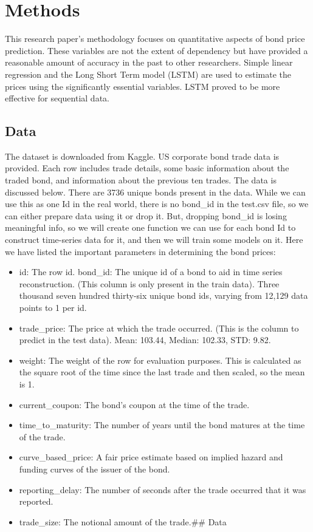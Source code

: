 \documentclass[
  man]{apa6}
\providecommand{\tightlist}{%
  \setlength{\itemsep}{0pt}\setlength{\parskip}{0pt}}
\begin{document}
\par

\hypertarget{methods}{%
\section{Methods}\label{methods}}

This research paper's methodology focuses on quantitative aspects of bond price prediction. These variables are not the extent of dependency but have provided a reasonable amount of accuracy in the past to other researchers. Simple linear regression and the Long Short Term model (LSTM) are used to estimate the prices using the significantly essential variables. LSTM proved to be more effective for sequential data.

\hypertarget{data}{%
\subsection{Data}\label{data}}

The dataset is downloaded from Kaggle. US corporate bond trade data is provided. Each row includes trade details, some basic information about the traded bond, and information about the previous ten trades. The data is discussed below. There are 3736 unique bonds present in the data. While we can use this as one Id in the real world, there is no bond\_id in the test.csv file, so we can either prepare data using it or drop it. But, dropping bond\_id is losing meaningful info, so we will create one function we can use for each bond Id to construct time-series data for it, and then we will train some models on it. Here we have listed the important parameters in determining the bond prices:

\begin{itemize}
\tightlist
\item
  id: The row id. bond\_id: The unique id of a bond to aid in time series reconstruction. (This column is only present in the train data). Three thousand seven hundred thirty-six unique bond ids, varying from 12,129 data points to 1 per id.
\item
  trade\_price: The price at which the trade occurred. (This is the column to predict in the test data). Mean: 103.44, Median: 102.33, STD: 9.82.
\item
  weight: The weight of the row for evaluation purposes. This is calculated as the square root of the time since the last trade and then scaled, so the mean is 1.
\item
  current\_coupon: The bond's coupon at the time of the trade.
\item
  time\_to\_maturity: The number of years until the bond matures at the time of the trade.
\item
  curve\_based\_price: A fair price estimate based on implied hazard and funding curves of the issuer of the bond.
\item
  reporting\_delay: The number of seconds after the trade occurred that it was reported.
\item
  trade\_size: The notional amount of the trade.\#\# Data
\end{itemize}
\end{document}

